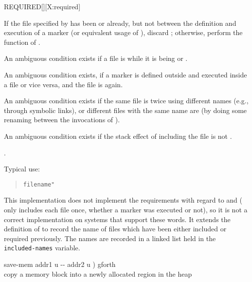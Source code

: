 \begin{worddef}{}{REQUIRED}[][X:required]
\item {}

	If the file specified by  has been 
	or  already, but not between the definition and
	execution of a marker (or equivalent usage of ),
	discard ; otherwise, perform the function of
	.

	An ambiguous condition exists if a file is  while
	it is being  or .

	An ambiguous condition exists, if a marker is defined outside and
	executed inside a file or vice versa, and the file is
	 again.

	An ambiguous condition exists if the same file is 
	twice using different names (e.g., through symbolic links), or
	different files with the same name are  (by doing
	some renaming between the invocations of ).

	An ambiguous condition exists if the stack effect of including the
	file is not .

\see {}.

	\begin{rationale} %
		Typical use:
		\begin{quote}
			 \texttt{filename"} 
		\end{quote}
	\end{rationale}

	\begin{implement}
		\dffamily
		This implementation does not implement the requirements with
		regard to  and  (
		only includes each file once, whether a marker was executed or
		not), so it is not a correct implementation on systems that
		support these words. It extends the definition of 
		to record the name of files which have been either included or
		required previously. The names are recorded in a linked list
		held in the \texttt{included-names} variable.

		\ttfamily
		\word{:} save-mem	 addr1 u -{}- addr2 u )  gforth \\
		 copy a memory block into a newly allocated region in the heap \\
		\tab {}  \\
		\tab {}   \\
		\tab {}   \word{ROT}   \word{;} \\


\end{implement}
\end{worddef}
